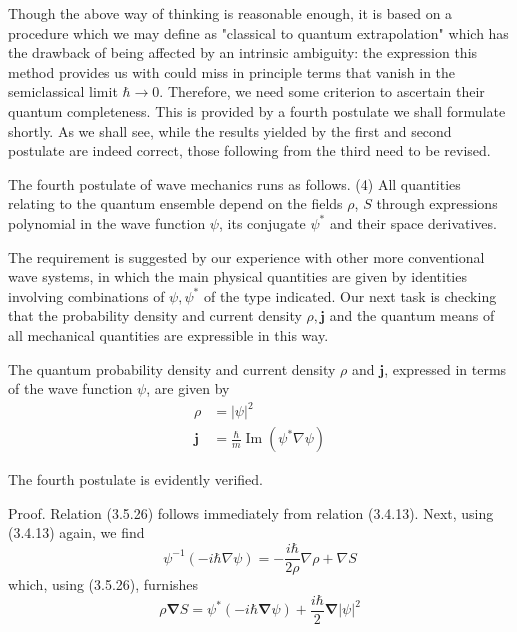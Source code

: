 \documentclass{article}
\begin{document}
Though the above way of thinking is reasonable enough, it is based on a procedure which we may define as "classical to quantum extrapolation" which has the drawback of being affected by an intrinsic ambiguity: the expression this method provides us with could miss in principle terms that vanish in the semiclassical limit $\hbar \rightarrow 0$. Therefore, we need some criterion to ascertain their quantum completeness. This is provided by a fourth postulate we shall formulate
shortly. As we shall see, while the results yielded by the first and second postulate are indeed correct, those following from the third need to be revised.

The fourth postulate of wave mechanics runs as follows.
(4) All quantities relating to the quantum ensemble depend on the fields $\rho$, $S$ through expressions polynomial in the wave function $\psi$, its conjugate $\psi^{*}$ and their space derivatives.

The requirement is suggested by our experience with other more conventional wave systems, in which the main physical quantities are given by identities involving combinations of $\psi, \psi^{*}$ of the type indicated. Our next task is checking that the probability density and current density $\rho, \boldsymbol{j}$ and the quantum means of all mechanical quantities are expressible in this way.

The quantum probability density and current density $\rho$ and $\boldsymbol{j}$, expressed in terms of the wave function $\psi$, are given by
$$
\begin{align*}
\rho & =|\psi|^{2}  \tag{3.5.26}\\
\boldsymbol{j} & =\frac{\hbar}{m} \operatorname{Im}\left(\psi^{*} \nabla \psi\right) \tag{3.5.27}
\end{align*}
$$

The fourth postulate is evidently verified.

Proof. Relation (3.5.26) follows immediately from relation (3.4.13).
Next, using (3.4.13) again, we find
$$
\begin{equation*}
\psi^{-1}(-i \hbar \nabla \psi)=-\frac{i \hbar}{2 \rho} \nabla \rho+\nabla S \tag{3.5.28}
\end{equation*}
$$
which, using (3.5.26), furnishes
$$
\begin{equation*}
\rho \boldsymbol{\nabla} S=\psi^{*}(-i \hbar \boldsymbol{\nabla} \psi)+\frac{i \hbar}{2} \boldsymbol{\nabla}|\psi|^{2} \tag{3.5.29}
\end{equation*}
$$
\end{document}
